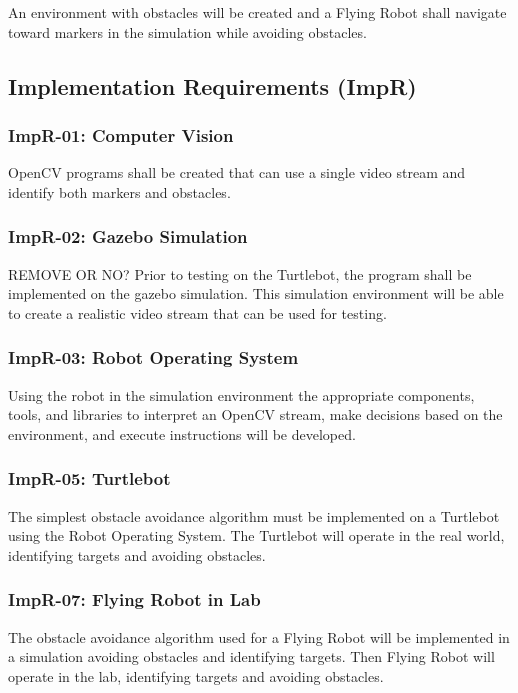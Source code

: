\documentclass{article}
\begin{document}
		An environment with obstacles will be created and a Flying Robot shall navigate toward markers in the simulation while avoiding obstacles.
		
	
	\subsection{Implementation Requirements (ImpR)}
	
		\subsubsection{ImpR-01: Computer Vision}
		
		OpenCV programs shall be created that can use a single video stream and identify both markers and obstacles.
	
		\subsubsection{ImpR-02: Gazebo Simulation}
		REMOVE OR NO?
		Prior to testing on the Turtlebot, the program shall be implemented on the gazebo simulation. This simulation environment will be able to create a realistic video stream that can be used for testing.
		
		\subsubsection{ImpR-03: Robot Operating System}
		
		Using the robot in the simulation environment the appropriate components, tools, and libraries to interpret an OpenCV stream, make decisions based on the environment, and execute instructions will be developed.
		
		\subsubsection{ImpR-05: Turtlebot}
		
		The simplest obstacle avoidance algorithm must be implemented on a Turtlebot using the Robot Operating System. The Turtlebot will operate in the real world, identifying targets and avoiding obstacles. 
		
		\subsubsection{ImpR-07: Flying Robot in Lab}
		
		The obstacle avoidance algorithm used for a Flying Robot will be implemented in a simulation avoiding obstacles and identifying targets. Then Flying Robot will operate in the lab, identifying targets and avoiding obstacles.
		
\end{document}
